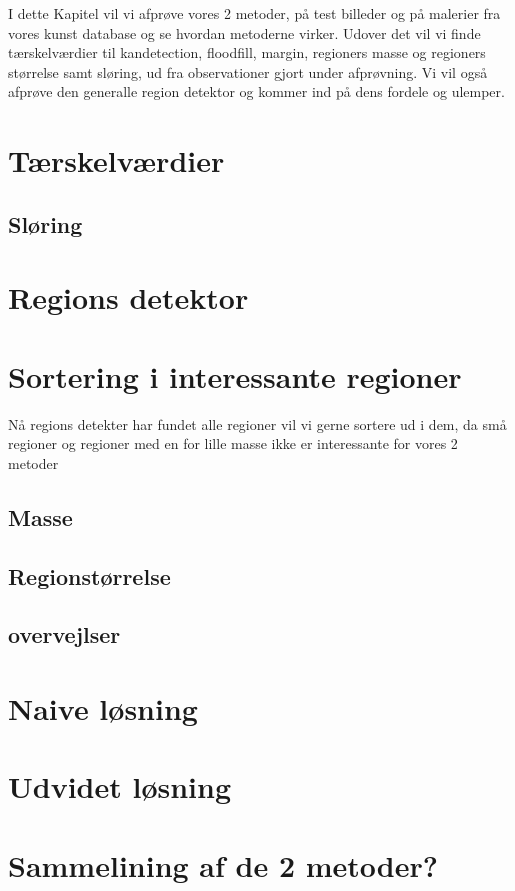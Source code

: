{
{\sffamily
I dette Kapitel vil vi afprøve vores 2 metoder, på test billeder og på
malerier fra vores kunst database og se hvordan metoderne virker. Udover
det vil vi finde tærskelværdier til kandetection, floodfill, margin,
regioners masse og regioners størrelse samt sløring, ud fra observationer
gjort under afprøvning. Vi vil også afprøve den generalle region
detektor og kommer ind på dens fordele og ulemper.}

\section{Tærskelværdier\label{terskelverdi}}

\clearpage

\subsection{Sløring}

\clearpage

\section{Regions detektor\label{region_detektor}}

\clearpage

\section{Sortering i interessante regioner}
{\sffamily 
Nå regions detekter har fundet alle regioner vil vi gerne sortere ud i
dem, da små regioner og regioner med en for lille masse ikke er
interessante for vores 2 metoder
}
\subsection{Masse}

\clearpage

\subsection{Regionstørrelse \label{region_stoerlse}}

\clearpage

\subsection{overvejlser}



\section{Naive løsning}

\clearpage

\section{Udvidet løsning}

\clearpage

\section{Sammelining af de 2 metoder?}

\clearpage


}

